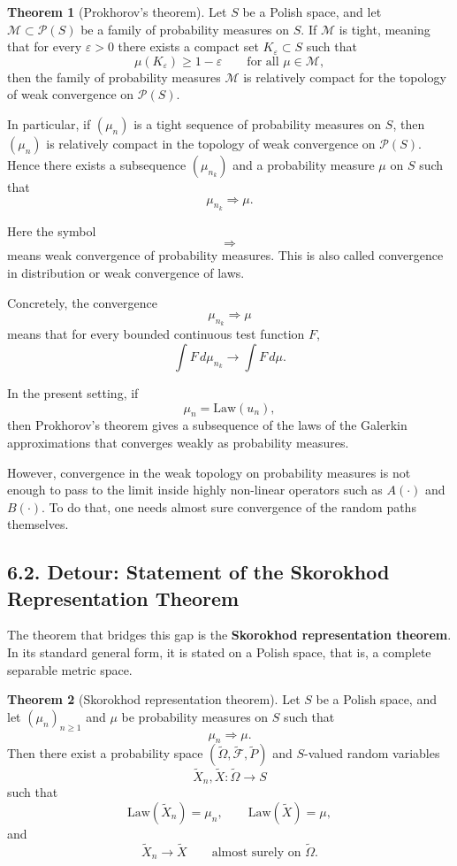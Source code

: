\documentclass[11pt]{article}
\theoremstyle{definition}
\newtheorem{theorem}{Theorem}
\theoremstyle{remark}
\begin{document}
\begin{theorem}[Prokhorov's theorem]
Let $S$ be a Polish space, and let $\mathcal M\subset \mathcal P(S)$ be a family of probability measures on $S$.
If $\mathcal M$ is tight, meaning that for every $\varepsilon>0$ there exists a compact set $K_\varepsilon\subset S$ such that
\[
  \mu(K_\varepsilon)\ge 1-\varepsilon
  \qquad \text{for all } \mu\in\mathcal M,
\]
then the family of probability measures $\mathcal M$ is relatively compact for the topology of weak convergence on $\mathcal P(S)$.
\par
In particular, if $(\mu_n)$ is a tight sequence of probability measures on $S$, then $(\mu_n)$ is relatively compact in the topology of weak convergence on $\mathcal P(S)$. Hence there exists a subsequence $(\mu_{n_k})$ and a probability measure $\mu$ on $S$ such that
\[
  \mu_{n_k}\Rightarrow \mu.
\]
\end{theorem}

Here the symbol
\[
  \Rightarrow
\]
means weak convergence of probability measures. This is also called convergence in distribution or weak convergence of laws.

Concretely, the convergence
\[
  \mu_{n_k}\Rightarrow \mu
\]
means that for every bounded continuous test function $F$,
\[
  \int F\,d\mu_{n_k}\to \int F\,d\mu.
\]

In the present setting, if
\[
  \mu_n=\mathrm{Law}(u_n),
\]
then Prokhorov's theorem gives a subsequence of the laws of the Galerkin approximations that converges weakly as probability measures.

However, convergence in the weak topology on probability measures is not enough to pass to the limit inside highly non-linear operators such as $A(\cdot)$ and $B(\cdot)$. To do that, one needs almost sure convergence of the random paths themselves.

\subsection*{6.2. Detour: Statement of the Skorokhod Representation Theorem}
The theorem that bridges this gap is the \textbf{Skorokhod representation theorem}. In its standard general form, it is stated on a Polish space, that is, a complete separable metric space.

\begin{theorem}[Skorokhod representation theorem]
Let $S$ be a Polish space, and let $(\mu_n)_{n\ge 1}$ and $\mu$ be probability measures on $S$ such that
\[
  \mu_n \Rightarrow \mu.
\]
Then there exist a probability space $(\widetilde\Omega,\widetilde{\mathcal F},\widetilde P)$ and $S$-valued random variables
\[
  \widetilde X_n,\widetilde X:\widetilde\Omega\to S
\]
such that
\[
  \mathrm{Law}(\widetilde X_n)=\mu_n,
  \qquad
  \mathrm{Law}(\widetilde X)=\mu,
\]
and
\[
  \widetilde X_n \to \widetilde X
  \qquad \text{almost surely on } \widetilde\Omega.
\]
\end{theorem}
\end{document}
